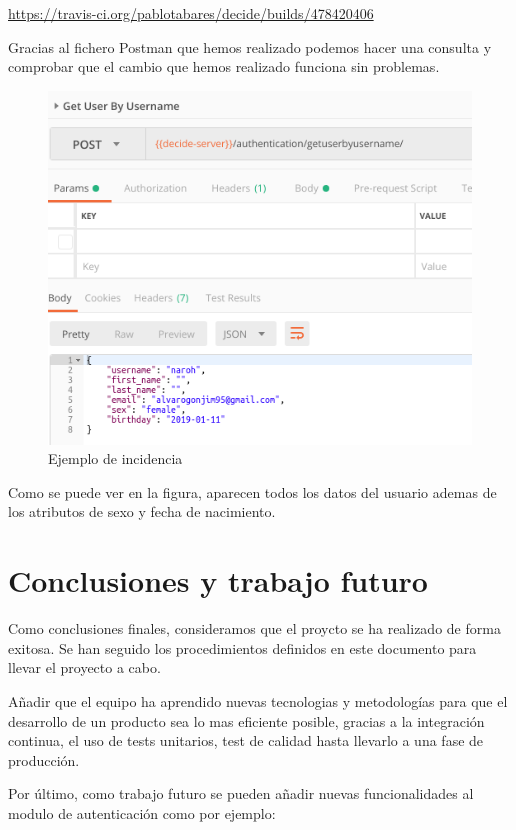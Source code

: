 \documentclass[12pt]{article}
\begin{document}
\url{https://travis-ci.org/pablotabares/decide/builds/478420406}

Gracias al fichero Postman que hemos realizado podemos hacer una consulta y comprobar que el cambio que hemos realizado funciona sin problemas.

\begin{figure}[h]
\centering
\includegraphics[width=1\textwidth]{call.png}
\caption{Ejemplo de incidencia}
\end{figure}

Como se puede ver en la figura, aparecen todos los datos del usuario ademas de los atributos de sexo y fecha de nacimiento.

\section{Conclusiones y trabajo futuro}

Como conclusiones finales, consideramos que el proycto se ha realizado de forma exitosa. Se han seguido los procedimientos definidos en este documento para llevar el proyecto a cabo.

Añadir que el equipo ha aprendido nuevas tecnologias y metodologías para que el desarrollo de un producto sea lo mas eficiente posible, gracias a la integración continua, el uso de tests unitarios, test de calidad hasta llevarlo a una fase de producción.

Por último, como trabajo futuro se pueden añadir nuevas funcionalidades al modulo de autenticación como por ejemplo:
\end{document}
